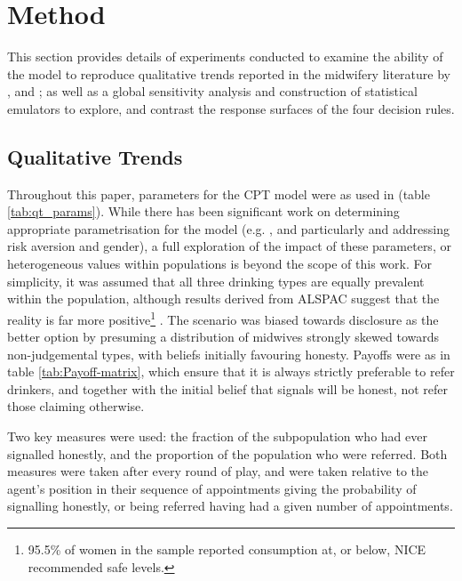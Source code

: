 \section{Method}
\label{sec:method}

This section provides details of experiments conducted to examine the ability of the model to reproduce qualitative trends reported in the midwifery literature by \citet{Alvik2006}, and \citet{Phillips2007}; as well as a global sensitivity analysis and construction of statistical emulators to explore, and contrast the response surfaces of the four decision rules.

\subsection{Qualitative Trends}
\label{sub:qt}

Throughout this paper, parameters for the \ac{CPT} model were as used in \cite{Tversky1992} (table \ref{tab:qt_params}). While there has been significant work on determining appropriate parametrisation for the model (e.g. \cite{Neilson2002,Nilsson2011,Glockner2012}, and particularly \citet{Byrnes1999} and \citet{Booij2009} addressing risk aversion and gender), a full exploration of the impact of these parameters, or heterogeneous values within populations is beyond the scope of this work. For simplicity, it was assumed that all three drinking types are equally prevalent within the population, although results derived from \acl{ALSPAC} suggest that the reality is far more positive\footnote{95.5\% of women in the sample reported consumption at, or below, \ac{NICE} recommended safe levels.} \citep{Humphriss2013}. The scenario was biased towards disclosure as the better option by presuming a distribution of midwives strongly skewed towards non-judgemental types, with beliefs initially favouring honesty. Payoffs were as in table \ref{tab:Payoff-matrix}, which ensure that it is always strictly preferable to refer drinkers, and together with the initial belief that signals will be honest, not refer those claiming otherwise.

Two key measures were used: the fraction of the subpopulation who had ever signalled honestly, and the proportion of the population who were referred. Both measures were taken after every round of play, and were taken relative to the agent's position in their sequence of appointments giving the probability of signalling honestly, or being referred having had a given number of appointments.

